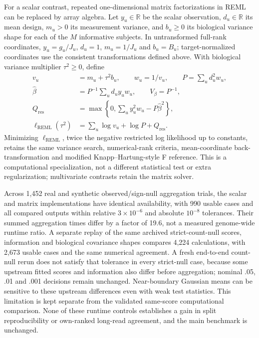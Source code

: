 \documentclass[11pt]{article}
\begin{document}
For a scalar contrast, repeated one-dimensional matrix factorizations in REML can be replaced by array algebra. Let \(y_u\in\mathbb R\) be the scalar observation, \(d_u\in\mathbb R\) its mean design, \(m_u>0\) its measurement variance, and \(b_u\ge0\) its biological variance shape for each of the \(M\) informative subjects. In untransformed full-rank coordinates, \(y_u=g_u/J_u\), \(d_u=1\), \(m_u=1/J_u\) and \(b_u=B_u\); target-normalized coordinates use the consistent transformations defined above. With biological variance multiplier \(\tau^2\ge0\), define \begin{equation}\begin{aligned}v_u&=m_u+\tau^2b_u,\qquad w_u=1/v_u,\qquad P=\sum_u d_u^2w_u,\\\widehat\beta&=P^{-1}\sum_u d_uy_uw_u,\qquad V_\beta=P^{-1},\\Q_{\mathrm{res}}&=\max\left\{0,\sum_u y_u^2w_u-P\widehat\beta^2\right\},\\\ell_{\mathrm{REML}}(\tau^2)&=\sum_u\log v_u+\log P+Q_{\mathrm{res}}.\end{aligned}\end{equation} Minimizing \(\ell_{\mathrm{REML}}\), twice the negative restricted log likelihood up to constants, retains the same variance search, numerical-rank criteria, mean-coordinate back-transformation and modified Knapp--Hartung-style F reference. This is a computational specialization, not a different statistical test or extra regularization; multivariate contrasts retain the matrix solver.

Across 1,452 real and synthetic observed/sign-null aggregation trials, the scalar and matrix implementations have identical availability, with 990 usable cases and all compared outputs within relative \(3\times10^{-6}\) and absolute \(10^{-8}\) tolerances. Their summed aggregation times differ by a factor of 19.6, not a measured genome-wide runtime ratio. A separate replay of the same archived strict-count-null scores, information and biological covariance shapes compares 4,224 calculations, with 2,673 usable cases and the same numerical agreement. A fresh end-to-end count-null rerun does not satisfy that tolerance in every strict-null case, because some upstream fitted scores and information also differ before aggregation; nominal .05, .01 and .001 decisions remain unchanged. Near-boundary Gaussian means can be sensitive to these upstream differences even with weak test statistics. This limitation is kept separate from the validated same-score computational comparison. None of these runtime controls establishes a gain in split reproducibility or own-ranked long-read agreement, and the main benchmark is unchanged.
\end{document}
